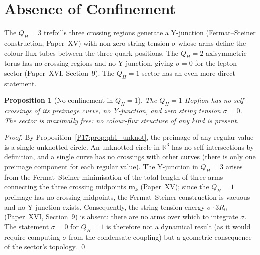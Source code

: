 \documentclass[11pt,a4paper]{article}
\newtheorem{proposition}[theorem]{Proposition}
\theoremstyle{definition}\newtheorem{definition}[theorem]{Definition}
\theoremstyle{remark}
\newcommand{\QH}{Q_H}
\begin{document}
\section{Absence of Confinement}
\label{P17:sec:confinement}

The $\QH=3$ trefoil's three crossing regions generate a Y-junction
(Fermat--Steiner construction, Paper~XV) with non-zero string tension
$\sigma$ whose arms define the colour-flux tubes between the three
quark positions. The $\QH=2$ axisymmetric torus has no crossing
regions and no Y-junction, giving $\sigma=0$ for the lepton sector
(Paper~XVI, Section~9).  %
The $\QH=1$ sector has an even more direct statement.

\begin{proposition}[No confinement in $\QH=1$]
\label{P17:prop:qh1_noconfinement}
The $\QH=1$ Hopfion has no self-crossings of its preimage curve, no
Y-junction, and zero string tension $\sigma=0$. The sector is
maximally free: no colour-flux structure of any kind is present.
\end{proposition}

\begin{proof}
By Proposition~\ref{P17:prop:qh1_unknot}, the preimage of any regular
value is a single unknotted circle. An unknotted circle in
$\mathbb{R}^3$ has no self-intersections by definition, and a single
curve has no crossings with other curves (there is only one preimage
component for each regular value). The Y-junction in $\QH=3$ arises
from the Fermat--Steiner minimisation of the total length of three
arms connecting the three crossing midpoints $\mathbf{m}_k$
(Paper~XV); since the $\QH=1$ preimage has no crossing midpoints, the
Fermat--Steiner construction is vacuous and no Y-junction exists.
Consequently, the string-tension energy $\sigma\cdot3R_0$ (Paper~XVI,
Section~9) is absent: %
there are no arms over which to integrate $\sigma$. The
statement $\sigma=0$ for $\QH=1$ is therefore not a dynamical
result (as it would require computing $\sigma$ from the condensate
coupling) but a geometric consequence of the sector's topology.
\qed
\end{proof}
\end{document}
